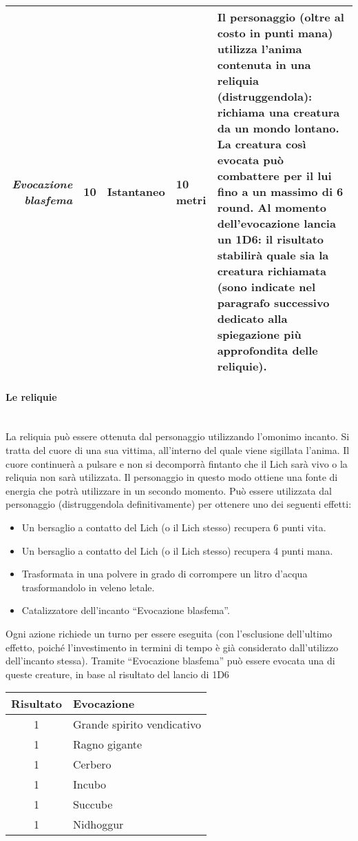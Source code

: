 \documentclass[../manuale_main.tex]{subfiles}
\begin{document}
\begin{tabularx}{\linewidth}{|N| D| T| G| Y|}
\hline
\textit{Evocazione blasfema} & 10  & Istantaneo & 10 metri &Il personaggio (oltre al costo in punti mana) utilizza l'anima contenuta in una reliquia (distruggendola): richiama una creatura da un mondo lontano. La creatura così evocata può combattere per il lui fino a un massimo di 6 round. Al momento dell'evocazione lancia un 1D6: il risultato stabilirà quale sia la creatura richiamata (sono indicate nel paragrafo successivo dedicato alla spiegazione più approfondita delle reliquie).  \\ \hline
\end{tabularx}

\paragraph{Le reliquie}\mbox{}\\
La reliquia può essere ottenuta dal personaggio utilizzando l'omonimo incanto. Si tratta del cuore di una sua vittima, all’interno del quale viene sigillata l’anima. Il cuore continuerà a pulsare e non si decomporrà fintanto che il Lich sarà vivo o la reliquia non sarà utilizzata. Il personaggio in questo modo ottiene una fonte di energia che potrà utilizzare in un secondo momento. Può essere utilizzata dal personaggio (distruggendola definitivamente) per ottenere uno dei seguenti effetti:
\begin{itemize}
\item Un bersaglio a contatto del Lich (o il Lich stesso) recupera 6 punti vita.
\item Un bersaglio a contatto del Lich (o il Lich stesso) recupera 4 punti mana.
\item Trasformata in una polvere in grado di corrompere un litro d'acqua trasformandolo in veleno letale.
\item Catalizzatore dell’incanto “Evocazione blasfema”.
\end{itemize}
Ogni azione richiede un turno per essere eseguita (con l'esclusione dell'ultimo effetto, poiché l'investimento in termini di tempo è già considerato dall'utilizzo dell’incanto stessa).
Tramite ``Evocazione blasfema'' può essere evocata una di queste creature, in base al risultato del lancio di 1D6

\begin{tabularx}{\linewidth}{|c |l|}
\hline
\textbf{Risultato}&\textbf{Evocazione}\\ \hline
1&Grande spirito vendicativo\\ \hline
1&Ragno gigante\\ \hline
1&Cerbero\\ \hline
1&Incubo\\ \hline
1&Succube\\ \hline
1&Nidhoggur\\ \hline
\end{tabularx}
\end{document}
